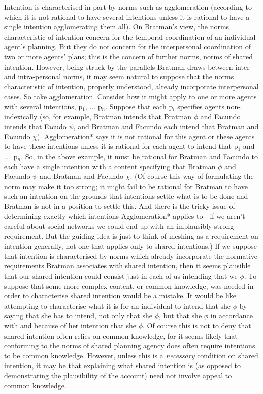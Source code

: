 \documentclass[12pt,letterpaper]{extarticle}
\begin{document}
Intention is characterised in part by norms such as agglomeration (according to which it is not rational to have several intentions unless it is rational to have a single intention agglomerating them all).
On Bratman's view, the norms characteristic of intention concern for the temporal coordination of an individual agent's planning.
But they do not concern for the interpersonal coordination of two or more agents' plans; this is the concern of further norms, norms of shared intention.
However, being struck by the parallels Bratman draws between inter- and intra-personal norms, it may seem natural to suppose that the norms characteristic of intention, properly understood, already incorporate interpersonal cases.
So take agglomeration.
Consider how it might apply to one or more agents with several intentions, p$_1$, ... p$_n$.
Suppose that each p$_i$ specifies agents non-indexically (so, for example, Bratman intends that Bratman $\phi$ and Facundo intends that Facudo $\psi$, and Bratman and Facundo each intend that Bratman and Facundo $\chi$).
Agglomeration* says it is not rational for this agent or these agents to have these intentions unless it is rational for each agent to intend that p$_1$ and ...\ p$_n$.  
So, in the above example, it must be rational for Bratman and Facundo to each have a single intention with a content specifying that Bratman $\phi$ and Facundo $\psi$ and Bratman and Facundo $\chi$.
(Of course this way of formulating the norm may make it too strong; it might fail to be rational for Bratman to have such an intention on the grounds that intentions settle what is to be done and Bratman is not in a position to settle this.
And there is the tricky issue of determining exactly which intentions Agglomeration* applies to---if we aren't careful about social networks we could end up with an implausibly strong requirement.
But the guiding idea is just to think of meshing as a requirement on intention generally, not one that applies only to shared intentions.)
If we suppose that intention is characterised by norms which already incorporate the normative requirements Bratman associates with shared intention, then it seems plausible that our shared intention could consist just in each of us intending that we $\phi$.
To suppose that some more complex content, or common knowledge, was needed in order to characterise shared intention would be a mistake.
It would be like attempting to characterise what it is for an individual to intend that she $\phi$ by saying that she has to intend, not only that she $\phi$, but that she $\phi$ in accordance with and because of her intention that she $\phi$.
Of course this is not to deny that shared intention often relies on common knowledge, for it seems likely that conforming to the norms of shared planning agency does often require intentions to be common knowledge.
However, unless this is a \emph{necessary} condition on shared intention, it may be that explaining what shared intention is (as opposed to demonstrating the plausibility of the account) need not involve appeal to common knowledge.
\end{document}
